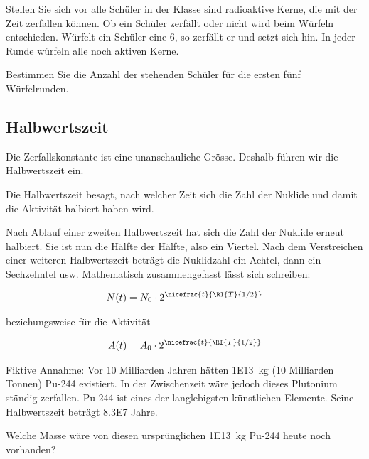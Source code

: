 \documentclass[12pt,a4paper,twoside]{article}
\begin{document}
\newpage
\begin{aufgabe}\label{ZerfallendeSchüler}
	Stellen Sie sich vor alle Schüler in der Klasse sind radioaktive Kerne, die mit der Zeit zerfallen können.
	Ob ein Schüler zerfällt oder nicht wird beim Würfeln entschieden. Würfelt ein Schüler eine 6, so zerfällt er und setzt sich hin.
    In jeder Runde würfeln alle noch aktiven Kerne.

Bestimmen Sie die Anzahl der stehenden Schüler für die ersten fünf Würfelrunden.
\end{aufgabe}

\subsection*{Halbwertszeit }

Die Zerfallskonstante ist eine unanschauliche Grösse. Deshalb führen wir die Halbwertszeit  ein.

Die Halbwertszeit besagt, nach welcher Zeit sich die Zahl der Nuklide und damit die Aktivität halbiert haben wird.

Nach Ablauf einer zweiten Halbwertszeit hat sich die Zahl der Nuklide erneut halbiert. 
Sie ist nun die Hälfte der Hälfte, also ein Viertel. Nach dem Verstreichen einer weiteren Halbwertszeit
beträgt die Nuklidzahl ein Achtel, dann ein Sechzehntel usw. Mathematisch zusammengefasst lässt sich schreiben:

\begin{eqnarray*}
	N(t) = N_0\cdot 2^{\nicefrac{t}{\RI{T}{1/2}}}
\end{eqnarray*}

beziehungsweise für die Aktivität

\begin{eqnarray*}
	A(t) = A_0\cdot 2^{\nicefrac{t}{\RI{T}{1/2}}}
\end{eqnarray*}

%
%
\begin{aufgabe}
	
Fiktive Annahme:
Vor 10 Milliarden Jahren hätten \SI{1E13}{kg} (10 Milliarden Tonnen) Pu-244 existiert. 
In der Zwischenzeit wäre jedoch dieses Plutonium ständig zerfallen. 
Pu-244 ist eines der langlebigsten künstlichen Elemente. Seine Halbwertszeit beträgt \num{8.3E7} Jahre.

Welche Masse wäre von diesen ursprünglichen \SI{1E13}{kg} Pu-244 heute noch vorhanden?
\end{aufgabe}
\end{document}
